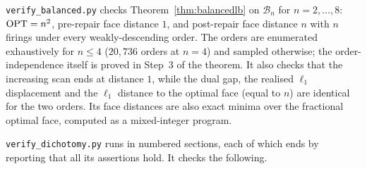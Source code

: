 \texttt{verify\_balanced.py} checks Theorem~\ref{thm:balancedlb} on $\mathcal{B}_n$ for
$n = 2, \dots, 8$: $\mathrm{OPT} = n^2$, pre-repair face distance $1$, and post-repair face distance $n$
with $n$ firings under every weakly-descending order. The orders are enumerated exhaustively for
$n \le 4$ ($20{,}736$ orders at $n = 4$) and sampled otherwise; the order-independence itself is
proved in Step~3 of the theorem. It also checks that the increasing scan ends at distance $1$,
while the dual gap, the realised $\ell_1$ displacement and the $\ell_1$ distance to the optimal
face (equal to $n$) are identical for the two orders. Its face distances are also exact minima over
the fractional optimal face, computed as a mixed-integer program.

\texttt{verify\_dichotomy.py} runs in numbered sections, each of which ends by reporting that all
its assertions hold. It checks the following.
